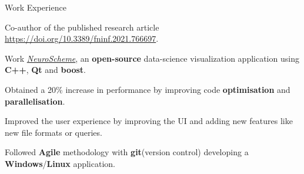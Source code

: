 \documentclass{resume} %
\begin{document}
\begin{mainSection}{Work Experience}
\begin{multiWorkExperience}
\item Co-author of the published research article \url{https://doi.org/10.3389/fninf.2021.766697}.


\item Work \textit{\href{https://github.com/vg-lab/NeuroScheme}{NeuroScheme}}, an \textbf{open-source} data-science visualization application using \textbf{C++}, \textbf{Qt} and \textbf{boost}.

\item  Obtained a 20\% increase in performance by improving code \textbf{optimisation} and \textbf{parallelisation}.

\item Improved the user experience by improving the UI and adding new features like new file formats or queries.

\item Followed \textbf{Agile} methodology with \textbf{git}(version control) developing a \textbf{Windows}/\textbf{Linux} application.
\end{multiWorkExperience}
\end{mainSection}
\end{document}
